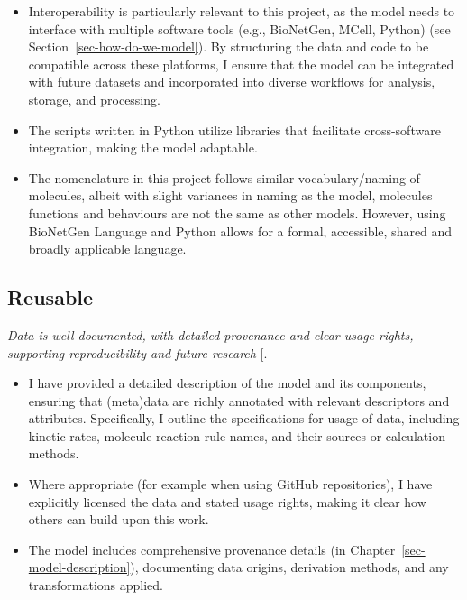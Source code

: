 \documentclass[
  11pt,
  letterpaper,
]{scrreprt}
\providecommand{\tightlist}{%
  \setlength{\itemsep}{0pt}\setlength{\parskip}{0pt}}\usepackage{longtable,booktabs,array}
\begin{document}
\begin{itemize}
\tightlist
\item
  Interoperability is particularly relevant to this project, as the
  model needs to interface with multiple software tools (e.g.,
  BioNetGen, MCell, Python) (see Section~\ref{sec-how-do-we-model}). By
  structuring the data and code to be compatible across these platforms,
  I ensure that the model can be integrated with future datasets and
  incorporated into diverse workflows for analysis, storage, and
  processing.
\item
  The scripts written in Python utilize libraries that facilitate
  cross-software integration, making the model adaptable.
\item
  The nomenclature in this project follows similar vocabulary/naming of
  molecules, albeit with slight variances in naming as the model,
  molecules functions and behaviours are not the same as other models.
  However, using BioNetGen Language and Python allows for a formal,
  accessible, shared and broadly applicable language.
\end{itemize}

\subsection{Reusable}\label{reusable}

\emph{Data is well-documented, with detailed provenance and clear usage
rights, supporting reproducibility and future research}
{[}\citeproc{ref-jacobsen2020FAIR}{378}{]}.

\begin{itemize}
\tightlist
\item
  I have provided a detailed description of the model and its
  components, ensuring that (meta)data are richly annotated with
  relevant descriptors and attributes. Specifically, I outline the
  specifications for usage of data, including kinetic rates, molecule
  reaction rule names, and their sources or calculation methods.
\item
  Where appropriate (for example when using GitHub repositories), I have
  explicitly licensed the data and stated usage rights, making it clear
  how others can build upon this work.
\item
  The model includes comprehensive provenance details (in
  Chapter~\ref{sec-model-description}), documenting data origins,
  derivation methods, and any transformations applied.
\end{itemize}
\end{document}
